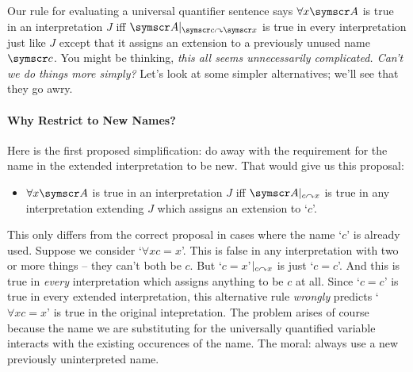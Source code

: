 \begin{earg}
Our rule for evaluating a universal quantifier sentence says $\forall x \meta{A}$ is true in an interpretation $J$ iff $\meta{A}\subs{\meta{c}}{\meta{x}}$ is true in every interpretation just like $J$ except that it assigns an extension to a previously unused name $\meta{c}$. You might be thinking, \emph{this all seems unnecessarily complicated. Can't we do things more simply?} Let's look at some simpler alternatives; we'll see that they go awry.

\paragraph{Why Restrict to New Names?} Here is the first proposed simplification: do away with the requirement for the name in the extended interpretation to be new. That would give us this proposal: \begin{itemize}
	\item $\forall x\meta{A}$ is true in an interpretation $J$ iff $\meta{A}\subs{c}{x}$ is true in any interpretation extending $J$ which assigns an extension to `$c$'. 
\end{itemize}
This only differs from the correct proposal in cases where the name `$c$' is already used. Suppose we consider `$\forall x c=x$'. This is false in any interpretation with two or more things – they can't both be $c$.  But `$c=x$'$\vert_{c\curvearrowright x}$ is just `$c=c$'. And this is true in \emph{every} interpretation which assigns anything to be $c$ at all.  Since `$c=c$' is true in every extended interpretation, this alternative rule \emph{wrongly} predicts `$\forall x c=x$' is true in the original intepretation. The problem arises of course because the name we are substituting for the universally quantified variable interacts with the existing occurences of the name.  The moral: always use a new previously uninterpreted name.





\end{earg}
